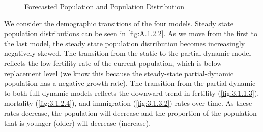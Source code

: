 \documentclass[10pt]{article}
\renewcommand{\thesection}{\arabic{section}}
\renewcommand{\thesubsection}{\thesection.\arabic{subsection}}
\renewcommand{\thesubsubsection}{\thesubsection.\arabic{subsubsection}}
\renewcommand{\section}[2][]{\oldsection[#1]{#2}\index{#1}\label{sec:\thesection}}
\renewcommand{\subsection}[2][]{\oldsubsection[#1]{#2}\index{#1}\label{sec:\thesubsection}}
\numberwithin{equation}{subsection}
\newcommand*{\FigureDir}{../../graphs}
\begin{document}
\begin{figure}[!ht]
   \centering
   \caption{\label{fig:\thesubsubsection.3}Forecasted Population and Population Distribution}
\end{figure}


\newpage
\section{Results}


\subsection{Demographics}

\par We consider the demographic transitions of the four models. Steady state population distributions can be seen in \autoref{fig:A.1.2.2}. As we move from the first to the last model, the steady state population distribution becomes increasingly negatively skewed. The transition from the static to the partial-dynamic model reflects the low fertility rate of the current population, which is below replacement level (we know this because the steady-state partial-dynamic population has a negative growth rate). The transition from the partial-dynamic to both full-dynamic models reflects the downward trend in fertility (\autoref{fig:3.1.1.3}), mortality (\autoref{fig:3.1.2.4}), and immigration (\autoref{fig:3.1.3.2}) rates over time. As these rates decrease, the population will decrease and the proportion of the population that is younger (older) will decrease (increase).
\end{document}
